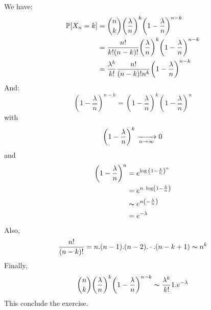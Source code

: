 \begin{solution}
  We have:
  \begin{align*}
    \mathbb{P}[X_n = k] & = \binom{n}{k} {\left( \frac{\lambda}{n} \right)}^k {\left(  1- \frac{\lambda}{n} \right)}^{n-k}        \\
                    & = \frac{n!}{k!(n-k)!} {\left( \frac{\lambda}{n} \right)}^k {\left(  1- \frac{\lambda}{n} \right)}^{n-k} \\
                    & = \frac{\lambda^k}{k!} \frac{n!}{(n-k)! n^k} {\left( 1- \frac{\lambda}{n} \right)}^{n-k}
  \end{align*}
  And:
  \[
    {\left(  1- \frac{\lambda}{n} \right)}^{n-k} = {\left(  1- \frac{\lambda}{n} \right)}^{k} {\left(  1- \frac{\lambda}{n} \right)}^{n}
  \]
  with
  \[
    {\left(  1- \frac{\lambda}{n} \right)}^{k} \xrightarrow[n \to{} \infty]{} 0
  \]
  and
  \begin{align*}
    {\left(  1- \frac{\lambda}{n} \right)}^n & = e^{\log{\left(  1- \frac{\lambda}{n} \right)}^n} \\
                                             & = e^{n.\log\left(  1- \frac{\lambda}{n} \right)}   \\
                                             & \thicksim e^{n\left( - \frac{\lambda}{n} \right)}  \\
                                             & = e^{-\lambda}
  \end{align*}
  Also,
  \[ \frac{n!}{(n-k)!}= n.(n-1).(n-2). \cdot . (n-k+1) \thicksim n^k \]
  Finally,
  \[
    \binom{n}{k} {\left( \frac{\lambda}{n} \right)}^k {\left(  1- \frac{\lambda}{n} \right)}^{n-k} \thicksim \frac{\lambda^k}{k!} 1. e^{-\lambda}
  \]
  This conclude the exercise.
\end{solution}